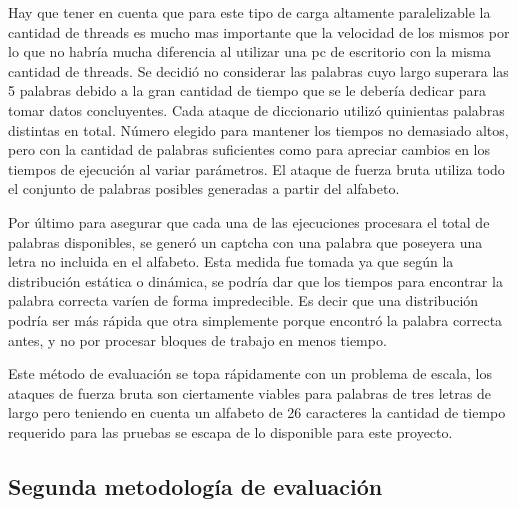 \documentclass[conference]{IEEEtran}
\begin{document}
Hay que tener en cuenta que para este tipo de carga altamente paralelizable la cantidad de threads es mucho mas importante que la velocidad de los mismos por lo que no habría mucha diferencia al utilizar una pc de escritorio con la misma cantidad de threads.  Se decidió no considerar las palabras cuyo largo superara las 5 palabras debido a la gran cantidad de tiempo que se le debería dedicar para tomar datos concluyentes.\newline
Cada ataque de diccionario utilizó quinientas palabras distintas en total. Número elegido para mantener los tiempos no demasiado altos, pero con la cantidad de palabras suficientes como para apreciar cambios en los tiempos de ejecución al variar parámetros. El ataque de fuerza bruta utiliza todo el conjunto de palabras posibles generadas a partir del alfabeto. \newline

Por último para asegurar que cada una de las ejecuciones procesara el total de palabras disponibles, se generó un captcha con una palabra que poseyera una letra no incluida en el alfabeto. Esta medida fue tomada ya que según la distribución estática o dinámica, se podría dar que los tiempos para encontrar la palabra correcta varíen de forma impredecible. Es decir que una distribución podría ser más rápida que otra simplemente porque encontró la palabra correcta antes, y no por procesar bloques de trabajo en menos tiempo.\newline

Este método de evaluación se topa rápidamente con un problema de escala, los ataques de fuerza bruta son ciertamente viables para palabras de tres letras de largo pero teniendo en cuenta un alfabeto de 26 caracteres la cantidad de tiempo requerido para las pruebas se escapa de lo disponible para este proyecto. 

\subsection{Segunda metodología de evaluación}
\end{document}
